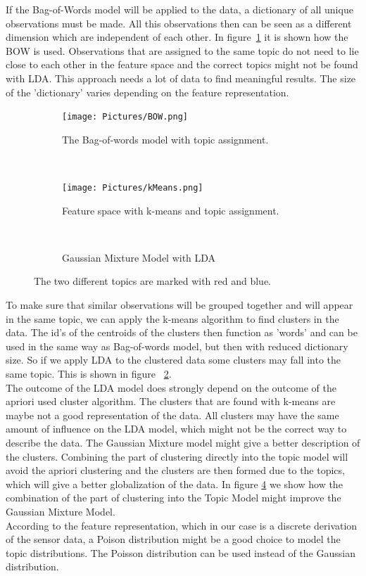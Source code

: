 \documentclass[11pt,a4paper]{article}
\begin{document}
If the Bag-of-Words model will be applied to the data, a dictionary of all unique observations must be made. All this observations then can be seen as a different dimension which are independent of each other. In figure~\ref{fig:FSBOW} it is shown how the BOW is used. Observations that are assigned to the same topic do not need to lie close to each other in the feature space and the correct topics might not be found with LDA. This approach needs a lot of data to find meaningful results. The size of the 'dictionary' varies depending on the feature representation. 

\begin{figure}[h!]
\centering
\begin{subfigure}[b]{0.3\linewidth}
\centering
\texttt{[image: Pictures/BOW.png]}
\caption{The Bag-of-words model with topic assignment.}
\label{fig:FSBOW}
\end{subfigure}
~
\begin{subfigure}[b]{0.3\linewidth}
\centering
\texttt{[image: Pictures/kMeans.png]}
\caption{Feature space with k-means and topic assignment.}
\label{fig:FSk-means}
\end{subfigure}
~
\begin{subfigure}[b]{0.3\textwidth}
\centering
\def\svgwidth{140pt}

\caption{Gaussian Mixture Model with LDA}
\label{fig:GMM+LDA}
\end{subfigure}
\caption{The two different topics are marked with red and blue.}
\end{figure}

To make sure that similar observations will be grouped together and will appear in the same topic, we can apply the k-means algorithm to find clusters in the data. The id's of the centroids of the clusters then function as 'words' and can be used in the same way as Bag-of-words model, but then with reduced dictionary size. So if we apply LDA to the clustered data some clusters may fall into the same topic. This is shown in figure ~\ref{fig:FSk-means}.\\
The outcome of the LDA model does strongly depend on the outcome of the apriori used cluster algorithm. The clusters that are found with k-means are maybe not a good representation of the data. All clusters may have the same amount of influence on the LDA model, which might not be the correct way to describe the data. The Gaussian Mixture model might give a better description of the clusters. Combining the part of clustering directly into the topic model will avoid the apriori clustering and the clusters are then formed due to the topics, which will give a better globalization of the data. In figure \ref{fig:GMM+LDA} we show how the combination of the part of clustering into the Topic Model might improve the Gaussian Mixture Model.\\
According to the feature representation, which in our case is a discrete derivation of the sensor data, a Poison distribution might be a good choice to model the topic distributions. The Poisson distribution can be used instead of the Gaussian distribution.
\end{document}

